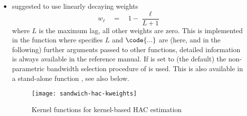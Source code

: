 \documentclass{Z}
\begin{document}
\begin{itemize}
\item \cite{hac:Newey+West:1987} suggested to use linearly decaying weights
\begin{equation} \label{eq:NeweyWest}
  w_\ell \quad = \quad 1 - \frac{\ell}{L + 1}
\end{equation}
where $L$ is the maximum lag, all other weights are zero. This is implemented in the
function  where  specifies $L$ and 
$\code{...}$ are (here, and in the following) further arguments passed to other
functions, detailed information is always available in the reference manual.
If  is set to  (the default) the non-parametric bandwidth selection
procedure of \cite{hac:Newey+West:1994} is used. This is also available in a stand-alone
function , see also below.

\begin{figure}[tbh]
\begin{center}
\texttt{[image: sandwich-hac-kweights]}
\caption{\label{fig:kweights} Kernel functions for kernel-based HAC estimation}
\end{center}
\end{figure}


\end{itemize}
\end{document}
